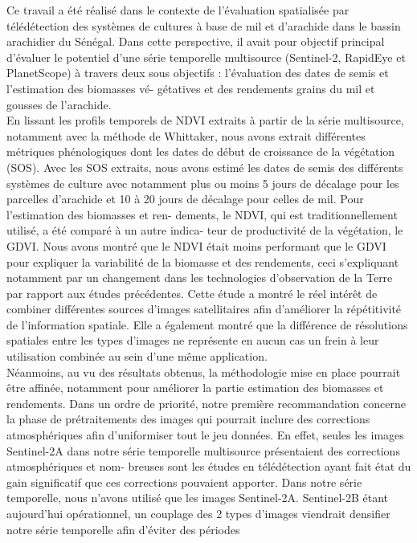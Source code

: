 Ce travail a été réalisé dans le contexte de l’évaluation spatialisée par télédétection
des systèmes de cultures à base de mil et d’arachide dans le bassin arachidier du
Sénégal. Dans cette perspective, il avait pour objectif principal d’évaluer le potentiel
d’une série temporelle multisource (Sentinel-2, RapidEye et PlanetScope) à travers
deux sous objectifs : l’évaluation des dates de semis et l’estimation des biomasses vé-
gétatives et des rendements grains du mil et gousses de l’arachide.
\\En lissant les profils temporels de NDVI extraits à partir de la série multisource,
notamment avec la méthode de Whittaker, nous avons extrait différentes métriques
phénologiques dont les dates de début de croissance de la végétation (SOS). Avec les
SOS extraits, nous avons estimé les dates de semis des différents systèmes de culture
avec notamment plus ou moins 5 jours de décalage pour les parcelles d’arachide et
10 à 20 jours de décalage pour celles de mil. Pour l’estimation des biomasses et ren-
dements, le NDVI, qui est traditionnellement utilisé, a été comparé à un autre indica-
teur de productivité de la végétation, le GDVI. Nous avons montré que le NDVI était
moins performant que le GDVI pour expliquer la variabilité de la biomasse et des
rendements, ceci s’expliquant notamment par un changement dans les technologies
d’observation de la Terre par rapport aux études précédentes. Cette étude a montré
le réel intérêt de combiner différentes sources d’images satellitaires afin d’améliorer
la répétitivité de l’information spatiale. Elle a également montré que la différence de
résolutions spatiales entre les types d’images ne représente en aucun cas un frein à
leur utilisation combinée au sein d’une même application.
\\Néanmoins, au vu des résultats obtenus, la méthodologie mise en place pourrait être
affinée, notamment pour améliorer la partie estimation des biomasses et rendements.
Dans un ordre de priorité, notre première recommandation concerne la phase de
prétraitements des images qui pourrait inclure des corrections atmosphériques afin
d’uniformiser tout le jeu données. En effet, seules les images Sentinel-2A dans notre
série temporelle multisource présentaient des corrections atmosphériques et nom-
breuses sont les études en télédétection ayant fait état du gain significatif que ces
corrections pouvaient apporter. Dans notre série temporelle, nous n’avons utilisé que
les images Sentinel-2A. Sentinel-2B étant aujourd’hui opérationnel, un couplage des
2 types d’images viendrait densifier notre série temporelle afin d’éviter des périodes
